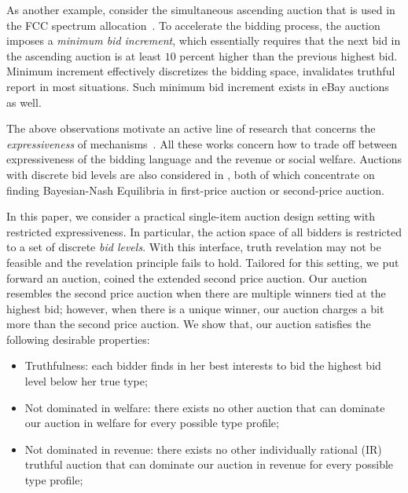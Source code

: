 \documentclass[letterpaper]{article}
\begin{document}
As another example, consider the simultaneous ascending auction that is used in the FCC spectrum allocation~\cite[Chapter 7]{Milgron2004}. To accelerate the bidding process, the auction imposes a {\em minimum bid increment}, which essentially requires that the next bid in the ascending auction is at least $10$ percent higher than the previous highest bid. Minimum increment effectively discretizes the bidding space, invalidates truthful report in most situations. Such minimum bid increment exists in eBay auctions as well. 

The above observations motivate an active line of research that concerns the {\em expressiveness} of mechanisms~\cite{Conitzer12:Computing,Parkes05:Optimize-and-Dispatch,Benisch2008,Peerapong2011}. All these works concern how to trade off between expressiveness of the bidding language and the revenue or social welfare. Auctions with discrete bid levels are also considered in \cite{naroditskiy2007using,rabinovich2013computing}, both of which concentrate on finding Bayesian-Nash Equilibria in first-price auction or second-price auction.

In this paper, we consider a practical single-item auction design setting with restricted expressiveness. In particular, the action space of all bidders is restricted to a set of discrete {\em bid levels}. With this interface, truth revelation may not be feasible and the revelation principle fails to hold. Tailored for this setting, we put forward an auction, coined the extended second price auction. Our auction resembles the second price auction when there are multiple winners tied at the highest bid; however, when there is a unique winner, our auction charges a bit more than the second price auction. We show that, our auction satisfies the following desirable properties:
\begin{itemize}
\item Truthfulness: each bidder finds in her best interests to bid the highest bid level below her true type;
\item Not dominated in welfare: there exists no other auction that can dominate our auction in welfare for every possible type profile;
\item Not dominated in revenue: there exists no other individually rational (IR) truthful auction that can dominate our auction in revenue for every possible type profile;
\end{itemize}
\end{document}
